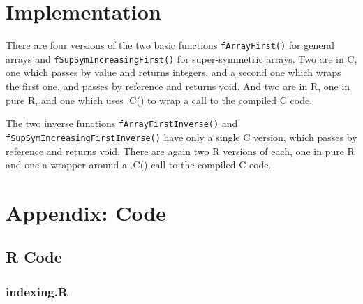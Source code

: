 \documentclass[12pt,]{article}
\begin{document}
\section{Implementation}\label{implementation}

There are four versions of the two basic functions
\texttt{fArrayFirst()} for general arrays and
\texttt{fSupSymIncreasingFirst()} for super-symmetric arrays. Two are in
C, one which passes by value and returns integers, and a second one
which wraps the first one, and passes by reference and returns void. And
two are in R, one in pure R, and one which uses .C() to wrap a call to
the compiled C code.

The two inverse functions \texttt{fArrayFirstInverse()} and
\texttt{fSupSymIncreasingFirstInverse()} have only a single C version,
which passes by reference and returns void. There are again two R
versions of each, one in pure R and one a wrapper around a .C() call to
the compiled C code.

\section{Appendix: Code}\label{appendix-code}

\subsection{R Code}\label{r-code}

\subsubsection{indexing.R}\label{indexing.r}
\end{document}
